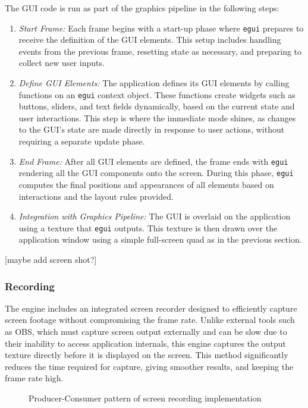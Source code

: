The GUI code is run as part of the graphics pipeline in the following steps:
\begin{enumerate}
\item \emph{Start Frame:} Each frame begins with a start-up phase where \verb|egui| prepares to receive the definition of the GUI elements. This setup includes handling events from the previous frame, resetting state as necessary, and preparing to collect new user inputs.

\item \emph{Define GUI Elements:} The application defines its GUI elements by calling functions on an \verb|egui| context object. These functions create widgets such as buttons, sliders, and text fields dynamically, based on the current state and user interactions. This step is where the immediate mode shines, as changes to the GUI's state are made directly in response to user actions, without requiring a separate update phase.

\item \emph{End Frame:} After all GUI elements are defined, the frame ends with \verb|egui| rendering all the GUI components onto the screen. During this phase, \verb|egui| computes the final positions and appearances of all elements based on interactions and the layout rules provided.

\item \emph{Integration with Graphics Pipeline:} The GUI is overlaid on the application using a texture that \verb|egui| outputs. This texture is then drawn over the application window using a simple full-screen quad as in the previous section.
\end{enumerate}

[maybe add screen shot?]
\subsubsection{Recording}

The engine includes an integrated screen recorder designed to efficiently capture screen footage without compromising the frame rate. Unlike external tools such as OBS, which must capture screen output externally and can be slow due to their inability to access application internals, this engine captures the output texture directly before it is displayed on the screen. This method significantly reduces the time required for capture, giving smoother results, and keeping the frame rate high.

\begin{figure}[H]
  \centering
  
  \caption{Producer-Consumer pattern of screen recording implementation}
\end{figure}


